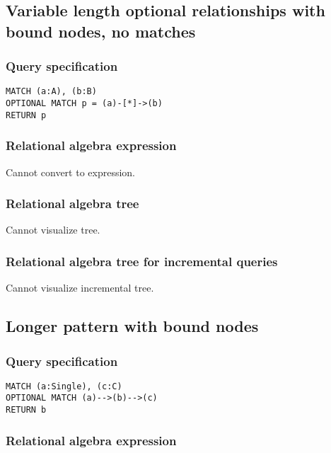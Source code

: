 \subsection{Variable length optional relationships with bound nodes, no matches}

\subsubsection*{Query specification}

\begin{lstlisting}
MATCH (a:A), (b:B)
OPTIONAL MATCH p = (a)-[*]->(b)
RETURN p
\end{lstlisting}

\subsubsection*{Relational algebra expression}

Cannot convert to expression.

\subsubsection*{Relational algebra tree}

Cannot visualize tree.

\subsubsection*{Relational algebra tree for incremental queries}

Cannot visualize incremental tree.

\subsection{Longer pattern with bound nodes}

\subsubsection*{Query specification}

\begin{lstlisting}
MATCH (a:Single), (c:C)
OPTIONAL MATCH (a)-->(b)-->(c)
RETURN b
\end{lstlisting}

\subsubsection*{Relational algebra expression}

